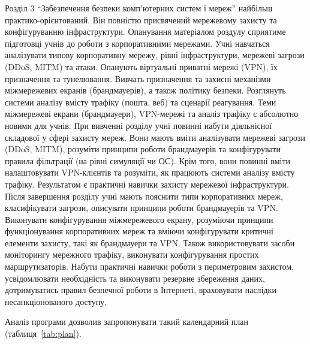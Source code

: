 Розділ 3 ``Забезпечення безпеки комп'ютерних систем і мереж'' найбільш практико-орієнтований. Він повністю присвячений мережевому захисту та конфігуруванню інфраструктури. Опанування матеріалом роздулу сприятиме підготовці учнів до роботи з корпоративними мережами. Учні навчаться аналізувати типову корпоративну мережу, рівні інфраструктури, мережеві загрози (DDoS, MITM) та атаки. Опанують віртуальні приватні мережі (VPN), їх призначення та тунелювання. Вивчать призначення та захисні механізми міжмережевих екранів (брандмауерів), а також політику безпеки.  Розглянуть системи аналізу вмісту трафіку (пошта, веб) та сценарії реагування.
Теми міжмережеві екрани (брандмауери), VPN-мережі та аналіз трафіку є абсолютно новими для учнів. При вивченні розділу учні повинні набути діяльнісної складової у сфері захисту мереж. Вони мають вміти аналізувати мережеві загрози (DDoS, MITM), розуміти принципи роботи брандмауерів та конфігурувати правила фільтрації (на рівні симуляції чи ОС). Крім того, вони повинні вміти налаштовувати VPN-клієнтів та розуміти, як працюють системи аналізу вмісту трафіку. Результатом є практичні навички захисту мережевої інфраструктури. 
Після завершення розділу учні мають пояснити типи корпоративних мереж, класифікувати загрози, описувати принципи роботи брандмауерів та VPN. Виконувати конфігурування міжмережевого екрану, розуміючи принципи функціонування корпоративних мереж та вміючи конфігурувати критичні елементи захисту, такі як брандмауери та VPN. Також використовувати засоби моніторингу мережного трафіку, виконувати конфігурування простих маршрутизаторів. Набути  практичні навички роботи з периметровим захистом, усвідомлювати необхідність та виконувати резервне збереження даних, дотримуватись правил безпечної роботи в Інтернеті, враховувати наслідки несанкціонованого доступу,
 

 Аналіз програми дозволив запропонувати такий календарний план (таблиця~\ref{tab:plan}).

